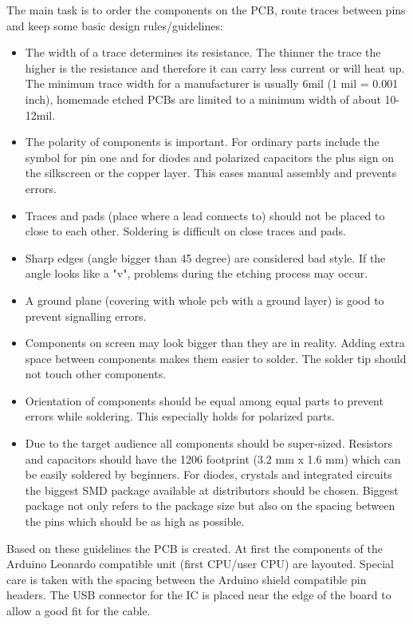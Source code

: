 The main task is to order the components on the PCB, route traces between pins and keep some basic design rules/guidelines:

\begin{itemize}
\item The width of a trace determines its resistance. The thinner the trace the higher is the resistance and therefore it can carry less current or will heat up. The minimum trace width for a manufacturer is usually 6mil (1 mil = 0.001 inch), homemade etched PCBs are limited to a minimum width of about 10-12mil.
\item The polarity of components is important. For ordinary parts include the symbol for pin one and for diodes and polarized capacitors the plus sign on the silkscreen or the copper layer. This eases manual assembly and prevents errors. \cite[p. 837]{horowitz1989art}
\item Traces and pads (place where a lead connects to) should not be placed to close to each other. Soldering is difficult on close traces and pads. 
\item Sharp edges (angle bigger than 45 degree) are considered bad style. If the angle looks like a "v", problems during the etching process may occur. \cite[p. 837]{horowitz1989art}
\item A ground plane (covering with whole pcb with a ground layer) is good to prevent signalling errors. \cite[p. 456]{horowitz1989art}
\item Components on screen may look bigger than they are in reality. Adding extra space between components makes them easier to solder. The solder tip should not touch other components.
\item Orientation of components should be equal among equal parts to prevent errors while soldering. This especially holds for polarized parts.
\item Due to the target audience all components should be super-sized. Resistors and capacitors should have the 1206 footprint (3.2 mm x 1.6 mm) which can be easily soldered by beginners. For diodes, crystals and integrated circuits the biggest SMD package available at distributors should be chosen. Biggest package not only refers to the package size but also on the spacing between the pins which should be as high as possible.
\end{itemize}

Based on these guidelines the PCB is created. At first the components of the Arduino Leonardo compatible unit (first CPU/user CPU) are layouted. Special care is taken with the spacing between the Arduino shield compatible pin headers. The USB connector for the IC is placed near the edge of the board to allow a good fit for the cable.

